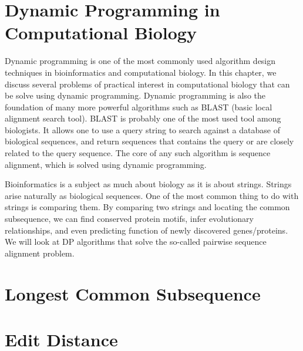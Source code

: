 \section{Dynamic Programming in Computational Biology}

Dynamic programming is one of the most commonly used algorithm design techniques in bioinformatics and computational biology. In this chapter, we discuss several problems of practical interest in computational biology that can be solve using dynamic programming. Dynamic programming is also the foundation of many more powerful algorithms such as BLAST (basic local alignment search tool). BLAST is probably one of the most used tool among biologists. It allows one to use a query string to search against a database of biological sequences, and return sequences that contains the query or are closely related to the query sequence. The core of any such algorithm is sequence alignment, which is solved using dynamic programming.

Bioinformatics is a subject as much about biology as it is about strings. Strings arise naturally as biological sequences. One of the most common thing to do with strings is comparing them. By comparing two strings and locating the common subsequence, we can find conserved protein motifs, infer evolutionary relationships, and even predicting function of newly discovered genes/proteins. We will look at DP algorithms that solve the so-called pairwise sequence alignment problem.

\section{Longest Common Subsequence}

\section{Edit Distance}

